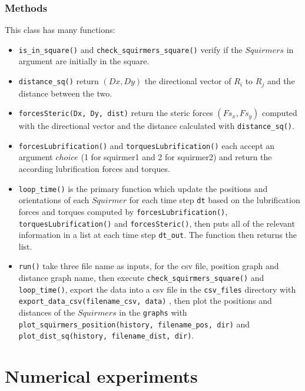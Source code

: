 \documentclass{article}
\begin{document}
\subsubsection*{Methods}
This class has many functions:
\begin{itemize}
   \item \texttt{is\_in\_square()} and \texttt{check\_squirmers\_square()} verify if the $Squirmers$ 
   in argument are initially in the square.
   \item \texttt{distance\_sq()} return $(Dx, Dy)$ the directional vector of $R_{i}$ to $R_{j}$ 
   and the distance between the two.
   \item \texttt{forcesSteric(Dx, Dy, dist)} return the steric forces $(Fs_x, Fs_y)$ computed with the directional vector and the distance calculated with \texttt{distance\_sq()}.
   \item \texttt{forcesLubrification()} and \texttt{torquesLubrification()} each accept an argument $choice$ (1 for squirmer1 and 2 for squirmer2)
   and return the according lubrification forces and torques.
   \item \texttt{loop\_time()} is the primary function which update the positions and orientations of each $Squirmer$
   for each time step \texttt{dt} based on the lubrification forces and torques computed by \texttt{forcesLubrification()}, 
   \texttt{torquesLubrification()} and \texttt{forcesSteric()}, then puts all of the relevant information in a list
   at each time step \texttt{dt\_out}. The function then returns the list.
   \item \texttt{run()} take three file name as inputs, for the csv file, position graph and distance graph name, 
   then execute \texttt{check\_squirmers\_square()} and \texttt{loop\_time()},
   export the data into a csv file in the \texttt{csv\_files} directory with \texttt{export\_data\_csv(filename\_csv, data)} 
   , then plot the positions and distances of the $Squirmers$ in the \texttt{graphs} with \texttt{plot\_squirmers\_position(history, filename\_pos, dir)}
   and \texttt{plot\_dist\_sq(history, filename\_dist, dir)}.
\end{itemize}

\section{Numerical experiments}
\end{document}
